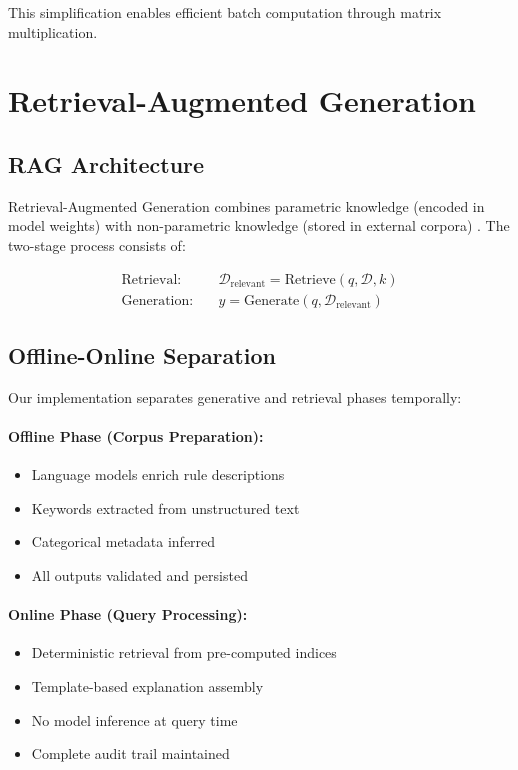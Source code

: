 This simplification enables efficient batch computation through matrix multiplication.

\section{Retrieval-Augmented Generation}

\subsection{RAG Architecture}

Retrieval-Augmented Generation combines parametric knowledge (encoded in model weights) with non-parametric knowledge (stored in external corpora) \cite{lewis2020rag}. The two-stage process consists of:

\begin{align}
\text{Retrieval}: & \quad \mathcal{D}_{\text{relevant}} = \text{Retrieve}(q, \mathcal{D}, k) \\
\text{Generation}: & \quad y = \text{Generate}(q, \mathcal{D}_{\text{relevant}})
\end{align}

\subsection{Offline-Online Separation}

Our implementation separates generative and retrieval phases temporally:

\paragraph{Offline Phase (Corpus Preparation):}
\begin{itemize}[leftmargin=*,itemsep=2pt,topsep=2pt]
\item Language models enrich rule descriptions
\item Keywords extracted from unstructured text
\item Categorical metadata inferred
\item All outputs validated and persisted
\end{itemize}

\paragraph{Online Phase (Query Processing):}
\begin{itemize}[leftmargin=*,itemsep=2pt,topsep=2pt]
\item Deterministic retrieval from pre-computed indices
\item Template-based explanation assembly
\item No model inference at query time
\item Complete audit trail maintained
\end{itemize}

